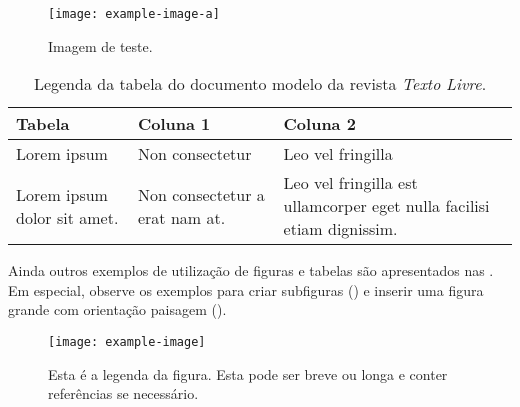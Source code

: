 \documentclass[anonymous=true]{textolivre}
\begin{document}
\begin{figure}[htbp]
 \centering
 \texttt{[image: example-image-a]}
 \caption{Imagem de teste.}
 \label{fig-img-a}
\end{figure}

\lipsum[12]

\begin{table}[htpb]
\caption{Legenda da tabela do documento modelo da revista \textit{Texto Livre}.}
\label{tbl-tabela-01}
\begin{tabular}{llp{4.3cm}}
\toprule 
Tabela                      & Coluna 1                       & Coluna 2                                                               \\ 
\midrule
Lorem ipsum                 & Non consectetur                & Leo vel fringilla                                                      \\ 
\midrule
Lorem ipsum dolor sit amet. & Non consectetur a erat nam at. & Leo vel fringilla est ullamcorper eget nulla facilisi etiam dignissim. \\ 
\bottomrule
\end{tabular}
\end{table}

\lipsum[3]

Ainda outros exemplos de utilização de figuras e tabelas são apresentados nas . Em especial, observe os exemplos para criar subfiguras () e inserir uma figura grande com orientação paisagem ().

\begin{figure}[htbp]
\centering
\texttt{[image: example-image]}
\caption{Esta é a legenda da figura. Esta pode ser breve ou longa e conter referências se necessário.}
\label{fig:example}
\end{figure}

\lipsum[30-35]
\end{document}
